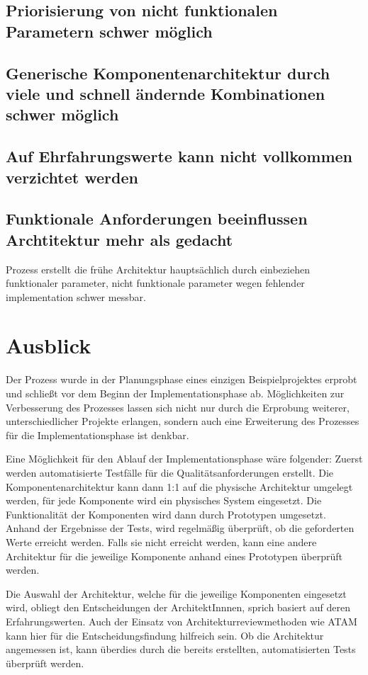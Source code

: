 \subsection{Priorisierung von nicht funktionalen Parametern schwer möglich}
\subsection{Generische Komponentenarchitektur durch viele und schnell ändernde Kombinationen schwer möglich}
\subsection{Auf Ehrfahrungswerte kann nicht vollkommen verzichtet werden}
\subsection{Funktionale Anforderungen beeinflussen Archtitektur mehr als gedacht}
Prozess erstellt die frühe Architektur hauptsächlich durch einbeziehen funktionaler parameter, nicht funktionale parameter wegen fehlender implementation schwer messbar.

\section{Ausblick}
Der Prozess wurde in der Planungsphase eines einzigen Beispielprojektes erprobt und schließt vor dem Beginn der Implementationsphase ab. Möglichkeiten zur Verbesserung des Prozesses lassen sich nicht nur durch die Erprobung weiterer, unterschiedlicher Projekte erlangen, sondern auch eine Erweiterung des Prozesses für die Implementationsphase ist denkbar.

Eine Möglichkeit für den Ablauf der Implementationsphase wäre folgender: Zuerst werden automatisierte Testfälle für die Qualitätsanforderungen erstellt. Die Komponentenarchitektur kann dann 1:1 auf die physische Architektur umgelegt werden, für jede Komponente wird ein physisches System eingesetzt. Die Funktionalität der Komponenten wird dann durch Prototypen umgesetzt. Anhand der Ergebnisse der Tests, wird regelmäßig überprüft, ob die geforderten Werte erreicht werden. Falls sie nicht erreicht werden, kann eine andere Architektur für die jeweilige Komponente anhand eines Prototypen überprüft werden.

Die Auswahl der Architektur, welche für die jeweilige Komponenten eingesetzt wird, obliegt den Entscheidungen der ArchitektInnnen, sprich basiert auf deren Erfahrungswerten. Auch der Einsatz von Architekturreviewmethoden wie ATAM kann hier für die Entscheidungsfindung hilfreich sein. Ob die Architektur angemessen ist, kann überdies durch die bereits erstellten, automatisierten Tests überprüft werden.


